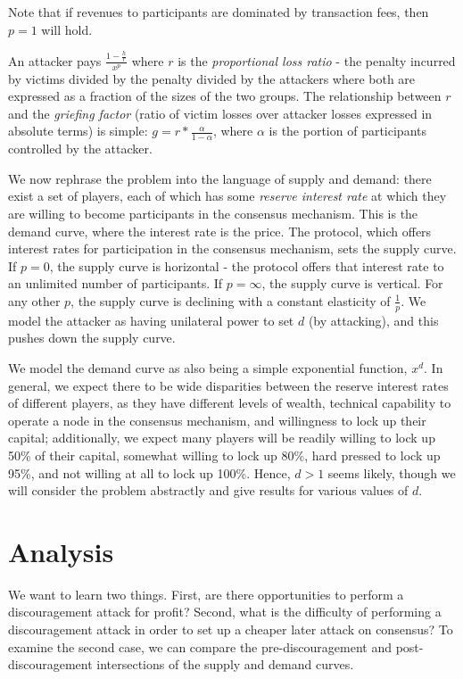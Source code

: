 \documentclass[12pt]{article}
\begin{document}
Note that if revenues to participants are dominated by transaction fees, then $p=1$ will hold.

An attacker pays $\frac{1-\frac{h}{r}}{x^p}$ where $r$ is the \textit{proportional loss ratio} - the penalty incurred by victims divided by the penalty divided by the attackers where both are expressed as a fraction of the sizes of the two groups. The relationship between $r$ and the \textit{griefing factor} (ratio of victim losses over attacker losses expressed in absolute terms) is simple: $g = r * \frac{\alpha}{1-\alpha}$, where $\alpha$ is the portion of participants controlled by the attacker.

We now rephrase the problem into the language of supply and demand: there exist a set of players, each of which has some \textit{reserve interest rate} at which they are willing to become participants in the consensus mechanism. This is the demand curve, where the interest rate is the price. The protocol, which offers interest rates for participation in the consensus mechanism, sets the supply curve. If $p=0$, the supply curve is horizontal - the protocol offers that interest rate to an unlimited number of participants. If $p=\infty$, the supply curve is vertical. For any other $p$, the supply curve is declining with a constant elasticity of $\frac{1}{p}$. We model the attacker as having unilateral power to set $d$ (by attacking), and this pushes down the supply curve.

We model the demand curve as also being a simple exponential function, $x^d$. In general, we expect there to be wide disparities between the reserve interest rates of different players, as they have different levels of wealth, technical capability to operate a node in the consensus mechanism, and willingness to lock up their capital; additionally, we expect many players will be readily willing to lock up 50\% of their capital, somewhat willing to lock up 80\%, hard pressed to lock up 95\%, and not willing at all to lock up 100\%. Hence, $d > 1$ seems likely, though we will consider the problem abstractly and give results for various values of $d$.

\section{Analysis}

We want to learn two things. First, are there opportunities to perform a discouragement attack for profit? Second, what is the difficulty of performing a discouragement attack in order to set up a cheaper later attack on consensus? To examine the second case, we can compare the pre-discouragement and post-discouragement intersections of the supply and demand curves.
\end{document}
